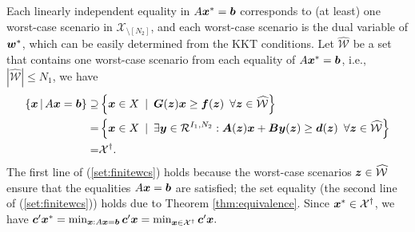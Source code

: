 \documentclass[fleqn,isre,blindrev]{informs4}
\newcommand{\mb}[1]{\mbox{\boldmath \ensuremath{#1}}}
\begin{document}
\begin{appendices}
{	Each linearly independent equality in $A\mb{x}^* = \mb{b}$ corresponds to (at least) one worst-case scenario in $\mathcal{X}_{\setminus [N_2]}$, and each worst-case scenario is the dual variable of $\mb{w}^*$, which can be easily determined from the KKT conditions. Let $\widehat{\mathcal{W}}$ be a set that contains one worst-case scenario from each equality of $A\mb{x}^* = \mb{b}$, i.e., $|\widehat{\mathcal{W}}| \le N_1$, we have
\begin{equation} \label{set:finitewcs}
	\begin{aligned}
	\left\{ \mb{x} \, | \,  A\mb{x} = \mb{b} \right\}   \supseteq& \left\{ \mb{x} \in X  \enskip | \enskip  \boldsymbol{G}(\boldsymbol{z}) \boldsymbol{x}  \ge \boldsymbol{f} (\boldsymbol{z}) \enskip \forall \boldsymbol{z} \in  \widehat{\mathcal{W}} \right\}\\
	=&  \left\{ \mb{x} \in X  \enskip |  \enskip \exists \mb{y} \in \mathcal{R}^{I_1,N_2}: \mb{A}(\mb{z}) \mb{x}+\mb{B}\mb{y}(\mb{z}) \geq\mb{d}(\mb{z})  \enskip \forall \mb{z} \in  \widehat{\mathcal{W}} \right\}\\
	=&  \mathcal{X}^{\dagger}.
	\end{aligned}
\end{equation}
	The first line of (\ref{set:finitewcs}) holds because the worst-case scenarios $\mb{z} \in \widehat{\mathcal{W}}$ ensure that the equalities $A\mb{x} = \mb{b}$ are satisfied; the set equality (the second line of (\ref{set:finitewcs})) holds due to Theorem \ref{thm:equivalence}. Since  $\mb{x}^* \in \mathcal{X}^{\dagger}$, we have
	$
	\mb{c}'\mb{x}^* = \min_{\boldsymbol{x} : A \boldsymbol{x} = \boldsymbol{b}} \mb{c}'\mb{x} = \min_{\boldsymbol{x} \in \mathcal{X}^{\dagger}} \mb{c}'\mb{x}.
	$ \hfill \Halmos
\fi

}\newpage
	

\end{appendices}
\end{document}

